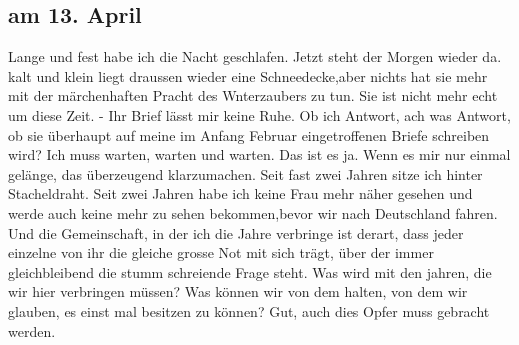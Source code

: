 \subsection{am 13. April}

Lange und fest habe ich die Nacht geschlafen.
Jetzt steht der Morgen wieder da.
kalt und klein liegt draussen wieder eine Schneedecke,aber nichts hat sie mehr mit der m\"{a}rchenhaften Pracht des Wnterzaubers zu tun.
Sie ist nicht mehr echt um diese Zeit.
- Ihr Brief l\"{a}sst mir keine Ruhe.
Ob ich Antwort, ach was Antwort, ob sie \"{u}berhaupt auf meine im Anfang Februar eingetroffenen Briefe schreiben wird?
Ich muss warten, warten und warten.
Das ist es ja.
Wenn es mir nur einmal gel\"{a}nge, das \"{u}berzeugend klarzumachen.
Seit fast zwei Jahren sitze ich hinter Stacheldraht.
Seit zwei Jahren habe ich keine Frau mehr n\"{a}her gesehen und werde auch keine mehr zu sehen bekommen,bevor wir nach Deutschland fahren.
Und die Gemeinschaft, in der ich die Jahre verbringe ist derart, dass jeder einzelne von ihr die gleiche grosse Not mit sich tr\"{a}gt, \"{u}ber der immer gleichbleibend die stumm schreiende Frage steht.
Was wird mit den jahren, die wir hier verbringen m\"{u}ssen?
Was k\"{o}nnen wir von dem halten, von dem wir glauben, es einst mal besitzen zu k\"{o}nnen?
Gut, auch dies Opfer muss gebracht werden.


\clearpage
